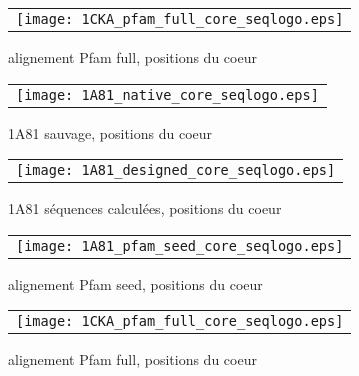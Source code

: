     \begin{figure}[h]
      \centering
      \begin{tabular}{c} 
        \texttt{[image: 1CKA\_pfam\_full\_core\_seqlogo.eps]} \\
      \end{tabular}
        
      \caption{alignement Pfam full, positions du coeur}
\label{}
    \end{figure}


    \clearpage


    \clearpage

    \begin{figure}[h]
      \centering
      \begin{tabular}{c} 
        \texttt{[image: 1A81\_native\_core\_seqlogo.eps]} \\
      \end{tabular}
        
      \caption{1A81 sauvage, positions du coeur}
\label{}
    \end{figure}

    \begin{figure}[h]
      \centering
      \begin{tabular}{c} 
        \texttt{[image: 1A81\_designed\_core\_seqlogo.eps]} \\
      \end{tabular}
        
      \caption{1A81 séquences calculées, positions du coeur}
\label{}
    \end{figure}

    \begin{figure}[h]
      \centering
      \begin{tabular}{c} 
        \texttt{[image: 1A81\_pfam\_seed\_core\_seqlogo.eps]} \\
      \end{tabular}
        
      \caption{alignement Pfam seed, positions du coeur}
\label{}
    \end{figure}

    \begin{figure}[h]
      \centering
      \begin{tabular}{c} 
        \texttt{[image: 1CKA\_pfam\_full\_core\_seqlogo.eps]} \\
      \end{tabular}
        
      \caption{alignement Pfam full, positions du coeur}
\label{}
    \end{figure}


